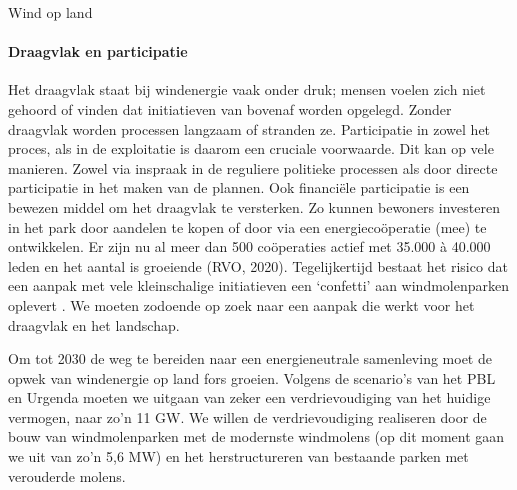 \begin{voorstel}{Wind op land}
\begin{multicols}{2}
\begin{overwegingen}
\paragraph{Draagvlak en participatie}
Het draagvlak staat bij windenergie vaak onder druk; mensen voelen zich niet gehoord of vinden dat initiatieven van bovenaf worden opgelegd. Zonder draagvlak worden processen langzaam of stranden ze. Participatie in zowel het proces, als in de exploitatie is daarom een cruciale voorwaarde. Dit kan op vele manieren. Zowel via inspraak in de reguliere politieke processen als door directe participatie in het maken van de plannen. Ook financiële participatie is een bewezen middel om het draagvlak te versterken. Zo kunnen bewoners investeren in het park door aandelen te kopen of door via een energiecoöperatie (mee) te ontwikkelen. Er zijn nu al meer dan 500 coöperaties actief met 35.000 à 40.000 leden en het aantal is groeiende (RVO, 2020). Tegelijkertijd bestaat het risico dat een aanpak met vele kleinschalige initiatieven een ‘confetti’ aan windmolenparken oplevert \parencite{college_van_rijksadviseurs_via_2019}. We moeten zodoende op zoek naar een aanpak die werkt voor het draagvlak en het landschap.

\end{overwegingen}

\begin{aanbevelingen}
Om tot 2030 de weg te bereiden naar een energieneutrale samenleving moet de opwek van windenergie op land fors groeien. Volgens de scenario’s van het PBL en Urgenda moeten we uitgaan van zeker een verdrievoudiging van het huidige vermogen, naar zo’n 11 GW. We willen de verdrievoudiging realiseren door de bouw van windmolenparken met de modernste windmolens (op dit moment gaan we uit van zo’n 5,6 MW) en het herstructureren van bestaande parken met verouderde molens.


\end{aanbevelingen}
\end{multicols}
\end{voorstel}
